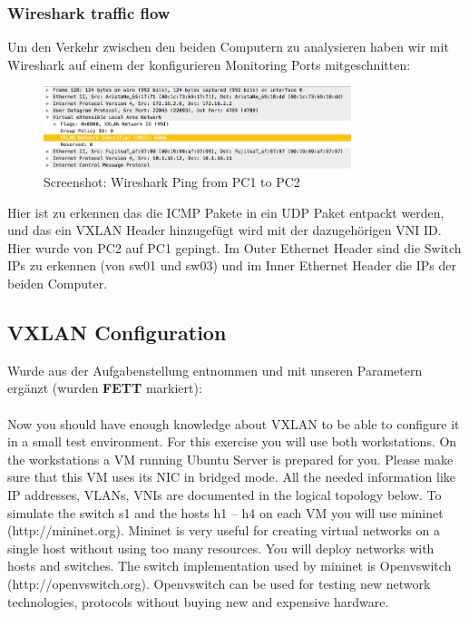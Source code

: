 \documentclass[a4,12pt]{scrartcl}
\begin{document}
\subsubsection{Wireshark traffic flow}
Um den Verkehr zwischen den beiden Computern zu analysieren haben wir mit Wireshark auf einem der konfigurieren Monitoring Ports mitgeschnitten: 
\begin{figure} [H]
	\begin{center}
	\includegraphics[width=0.80\textwidth]{./pictures/vxlan_ex3_sniff.png}
	\caption{Screenshot: Wireshark Ping from PC1 to PC2}
	\label{x}
	\end{center}
\end{figure}
\noindent Hier ist zu erkennen das die ICMP Pakete in ein UDP Paket entpackt werden, und das ein VXLAN Header hinzugefügt wird mit der dazugehörigen VNI ID. Hier wurde von PC2 auf PC1 gepingt. Im Outer Ethernet Header sind die Switch IPs zu erkennen (von sw01 und sw03) und im Inner Ethernet Header die IPs der beiden Computer. 

\subsection{VXLAN Configuration}
Wurde aus der Aufgabenstellung entnommen und mit unseren Parametern ergänzt (wurden \textbf{FETT} markiert): \\
\\
Now you should have enough knowledge about VXLAN to be able to configure it in a small test environment. For this exercise you will use both workstations. On the workstations a VM running Ubuntu Server is prepared for you. Please make sure that this VM uses its NIC in bridged mode. All the needed information like IP addresses, VLANs, VNIs are documented in the logical topology below.
To simulate the switch s1 and the hosts h1 – h4 on each VM you will use mininet (http://mininet.org).
Mininet is very useful for creating virtual networks on a single host without using too many resources. You will deploy networks with hosts and switches. The switch implementation used by mininet is Openvswitch (http://openvswitch.org). Openvswitch can be used for testing new network technologies, protocols without buying new and expensive hardware.
\end{document}
